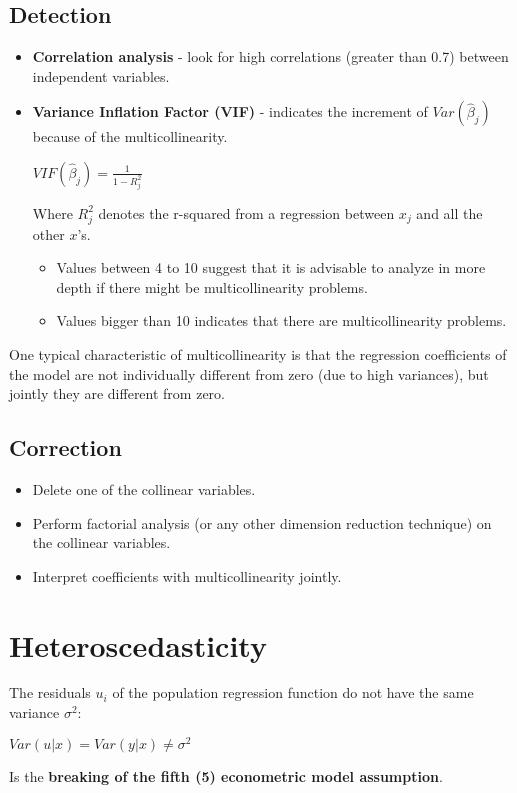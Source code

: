 \documentclass[10pt, a4paper, landscape]{extarticle}
\begin{document}
\begin{multicols}{3}
	\subsection*{Detection}
		\begin{itemize}[leftmargin=*]
			\item \textbf{Correlation analysis} - look for high correlations (greater than 0.7) between independent variables.
			\item \textbf{Variance Inflation Factor (VIF)} - indicates the increment of $Var(\hat{\beta}_j)$ because of the multicollinearity.
			\begin{center}
				$VIF(\hat{\beta}_j) = \frac{1}{1-R_j^2}$
			\end{center}
			Where $R^2_j$ denotes the r-squared from a regression between $x_j$ and all the other $x$'s. 
			\begin{itemize}[leftmargin=*]
				\item Values between 4 to 10 suggest that it is advisable to analyze in more depth if there might be multicollinearity problems.
				\item Values bigger than 10 indicates that there are multicollinearity problems.
			\end{itemize}
		\end{itemize}
		One typical characteristic of multicollinearity is that the regression coefficients of the model are not individually different from zero (due to high variances), but jointly they are different from zero.
	\subsection*{Correction}
		\begin{itemize}[leftmargin=*]
			\item Delete one of the collinear variables.
			\item Perform factorial analysis (or any other dimension reduction technique) on the collinear variables.
			\item Interpret coefficients with multicollinearity jointly.
		\end{itemize}
\columnbreak
\section*{Heteroscedasticity}
	The residuals $u_i$ of the population regression function do not have the same variance $\sigma^2$:
	\begin{center}
		$Var(u|x) = Var(y|x) \neq \sigma^2$
	\end{center}
	Is the \textbf{breaking of the fifth (5) econometric model assumption}.

\end{multicols}
\end{document}
